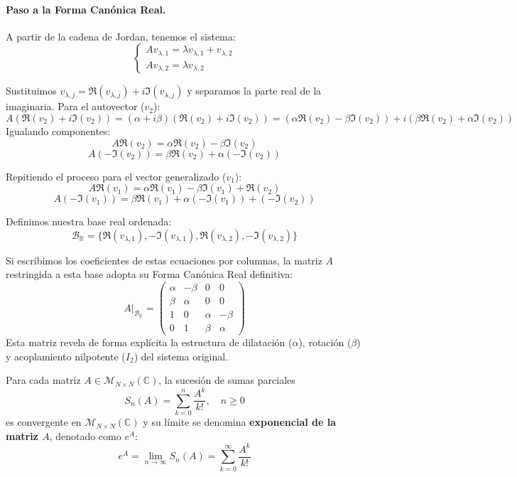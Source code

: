 {    \paragraph{Paso a la Forma Canónica Real.}
    A partir de la cadena de Jordan, tenemos el sistema:
    $$ \begin{cases}
        A v_{\lambda,1} = \lambda v_{\lambda,1} + v_{\lambda,2} \\
        A v_{\lambda,2} = \lambda v_{\lambda,2}
    \end{cases} $$

    Sustituimos $v_{\lambda, j} = \Re(v_{\lambda, j}) + i \Im(v_{\lambda, j})$ y separamos la parte real de la imaginaria. 
    Para el autovector ($v_2$):
    $$ A(\Re(v_2) + i \Im(v_2)) = (\alpha + i\beta)(\Re(v_2) + i \Im(v_2)) = (\alpha \Re(v_2) - \beta \Im(v_2)) + i(\beta \Re(v_2) + \alpha \Im(v_2)) $$
    Igualando componentes:
    $$ A \Re(v_2) = \alpha \Re(v_2) - \beta \Im(v_2) $$
    $$ A (-\Im(v_2)) = \beta \Re(v_2) + \alpha (-\Im(v_2)) $$

    Repitiendo el proceso para el vector generalizado ($v_1$):
    $$ A \Re(v_1) = \alpha \Re(v_1) - \beta \Im(v_1) + \Re(v_2) $$
    $$ A (-\Im(v_1)) = \beta \Re(v_1) + \alpha (-\Im(v_1)) + (-\Im(v_2)) $$

    Definimos nuestra base real ordenada:
    $$ \mathcal{B}_{\mathbb{R}} = \{\Re(v_{\lambda,1}), -\Im(v_{\lambda,1}), \Re(v_{\lambda,2}), -\Im(v_{\lambda,2})\} $$

    Si escribimos los coeficientes de estas ecuaciones por columnas, la matriz $A$ restringida a esta base adopta su Forma Canónica Real definitiva:
    $$ A |_{\mathcal{B}_{\mathbb{R}}} = \begin{pmatrix}
        \alpha & -\beta & 0 & 0 \\
        \beta & \alpha & 0 & 0 \\
        1 & 0 & \alpha & -\beta \\
        0 & 1 & \beta & \alpha
    \end{pmatrix} $$
    Esta matriz revela de forma explícita la estructura de dilatación ($\alpha$), rotación ($\beta$) y acoplamiento nilpotente ($I_2$) del sistema original.
}


\begin{teorema}
    Para cada matriz $A \in \mathcal{M}_{N \times N}(\mathbb{C})$, la sucesión de sumas parciales 
    \[
        S_n (A) = \sum_{k=0}^n \frac{A^k}{k!}, \quad n \ge 0
    \]
    es convergente en $\mathcal{M}_{N \times N}(\mathbb{C})$ y su límite se denomina \textbf{exponencial de la matriz $A$}, denotado como $e^A$:
    \[
        e^A = \lim_{n \to \infty} S_n(A) = \sum_{k=0}^\infty \frac{A^k}{k!}
    \]
\end{teorema}

